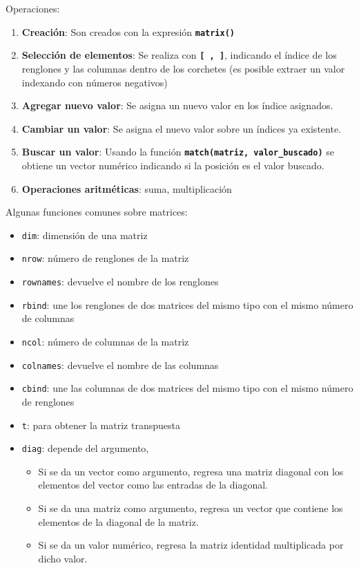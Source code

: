 \documentclass[]{book}
\begin{document}
Operaciones:

\begin{enumerate}
\def\labelenumi{\arabic{enumi}.}
\item
  \textbf{Creación}: Son creados con la expresión \textbf{\texttt{matrix()}}
\item
  \textbf{Selección de elementos}: Se realiza con \textbf{\texttt{{[}\ ,\ {]}}}, indicando el índice de los renglones y las columnas dentro de los corchetes (es posible extraer un valor indexando con números negativos)
\item
  \textbf{Agregar nuevo valor}: Se asigna un nuevo valor en los índice asignados.
\item
  \textbf{Cambiar un valor}: Se asigna el nuevo valor sobre un índices ya existente.
\item
  \textbf{Buscar un valor}: Usando la función \textbf{\texttt{match(matriz,\ valor\_buscado)}} se obtiene un vector numérico indicando si la posición es el valor buscado.
\item
  \textbf{Operaciones aritméticas}: suma, multiplicación
\end{enumerate}

Algunas funciones comunes sobre matrices:

\begin{itemize}
\item
  \texttt{dim}: dimensión de una matriz
\item
  \texttt{nrow}: número de renglones de la matriz
\item
  \texttt{rownames}: devuelve el nombre de los renglones
\item
  \texttt{rbind}: une los renglones de dos matrices del mismo tipo con el mismo número de columnas
\item
  \texttt{ncol}: número de columnas de la matriz
\item
  \texttt{colnames}: devuelve el nombre de las columnas
\item
  \texttt{cbind}: une las columnas de dos matrices del mismo tipo con el mismo número de renglones
\item
  \texttt{t}: para obtener la matriz transpuesta
\item
  \texttt{diag}: depende del argumento,

  \begin{itemize}
  \item
    Si se da un vector como argumento, regresa una matriz diagonal con los elementos del
    vector como las entradas de la diagonal.
  \item
    Si se da una matriz como argumento, regresa un vector que contiene
    los elementos de la diagonal de la matriz.
  \item
    Si se da un valor numérico, regresa la matriz
    identidad multiplicada por dicho valor.
  \end{itemize}
\end{itemize}
\end{document}
